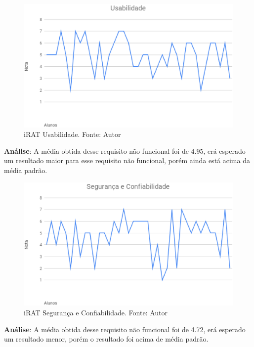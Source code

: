 \begin{figure}[H]
	\centering
  \includegraphics[keepaspectratio=true,scale=0.5]{figuras/iRAT_Usabilidade.eps}
  \caption[iRAT Usabilidade.]{iRAT Usabilidade. Fonte: Autor}
\end{figure}

\textbf{Análise}: A média obtida desse requisito não funcional foi de 4.95, erá esperado um resultado maior para
esse requisito não funcional, porém ainda está acima da média padrão.

\begin{figure}[H]
	\centering
  \includegraphics[keepaspectratio=true,scale=0.5]{figuras/iRAT_Seguranca_e_Confiabilidade.eps}
  \caption[iRAT Segurança e Confiabilidade.]{iRAT Segurança e Confiabilidade. Fonte: Autor}
\end{figure}

\textbf{Análise}: A média obtida desse requisito não funcional foi de 4.72, erá esperado um resultado menor, porém o
resultado foi acima de média padrão.

